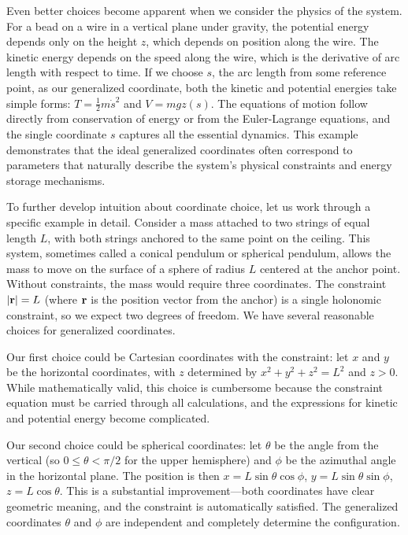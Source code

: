 Even better choices become apparent when we consider the physics of the system. For a bead on a wire in a vertical plane under gravity, the potential energy depends only on the height $z$, which depends on position along the wire. The kinetic energy depends on the speed along the wire, which is the derivative of arc length with respect to time. If we choose $s$, the arc length from some reference point, as our generalized coordinate, both the kinetic and potential energies take simple forms: $T = \frac{1}{2}m\dot{s}^2$ and $V = mgz(s)$. The equations of motion follow directly from conservation of energy or from the Euler-Lagrange equations, and the single coordinate $s$ captures all the essential dynamics. This example demonstrates that the ideal generalized coordinates often correspond to parameters that naturally describe the system's physical constraints and energy storage mechanisms.

To further develop intuition about coordinate choice, let us work through a specific example in detail. Consider a mass attached to two strings of equal length $L$, with both strings anchored to the same point on the ceiling. This system, sometimes called a conical pendulum or spherical pendulum, allows the mass to move on the surface of a sphere of radius $L$ centered at the anchor point. Without constraints, the mass would require three coordinates. The constraint $|{\bf r}| = L$ (where ${\bf r}$ is the position vector from the anchor) is a single holonomic constraint, so we expect two degrees of freedom. We have several reasonable choices for generalized coordinates.

Our first choice could be Cartesian coordinates with the constraint: let $x$ and $y$ be the horizontal coordinates, with $z$ determined by $x^2 + y^2 + z^2 = L^2$ and $z > 0$. While mathematically valid, this choice is cumbersome because the constraint equation must be carried through all calculations, and the expressions for kinetic and potential energy become complicated.

Our second choice could be spherical coordinates: let $\theta$ be the angle from the vertical (so $0 \leq \theta < \pi/2$ for the upper hemisphere) and $\phi$ be the azimuthal angle in the horizontal plane. The position is then $x = L\sin\theta\cos\phi$, $y = L\sin\theta\sin\phi$, $z = L\cos\theta$. This is a substantial improvement—both coordinates have clear geometric meaning, and the constraint is automatically satisfied. The generalized coordinates $\theta$ and $\phi$ are independent and completely determine the configuration.

